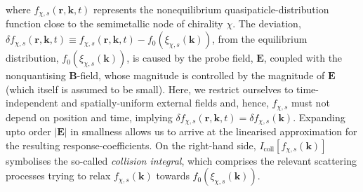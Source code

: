 \documentclass[aps,prb,onecolumn,nofootinbib,citeautoscript,10pt]{revtex4-2}
\begin{document}
where $f_{\chi, s}  (\boldsymbol r, \boldsymbol k, t) $ represents the nonequilibrium quasipaticle-distribution function close to the semimetallic node of chirality $\chi$. The deviation, $ \delta f_{\chi, s} (\boldsymbol r, \boldsymbol k, t) \equiv 
f_{\chi, s}  (\boldsymbol r, \boldsymbol k, t) - f_0 (\xi_{\chi, s} (\boldsymbol k) )$, from the equilibrium distribution, $ f_0 (\xi_{\chi, s}(\boldsymbol k) )$, is caused by the probe field, $\boldsymbol E $, coupled with the nonquantising $\boldsymbol B$-field, whose magnitude is controlled by the magnitude of $\boldsymbol E$ (which itself is assumed to be small). Here, we restrict ourselves to time-independent and spatially-uniform external fields and, hence, $f_{\chi, s} $ must not depend on position and time, implying $ \delta f_{\chi, s}  (\boldsymbol r, \boldsymbol k, t) = \delta f_{\chi, s}  (\boldsymbol k)$. Expanding upto order $|\boldsymbol E|$ in smallness allows us to arrive at the linearised approximation for the resulting response-coefficients. On the right-hand side, $ I_{\text{coll}} [f_{\chi, s} ({\boldsymbol k}) ] $ symbolises the so-called \textit{collision integral}, which comprises the relevant scattering processes trying to relax $f_{\chi, s} ({\boldsymbol k})$ towards $f_0 (\xi_{\chi, s}({\boldsymbol k}))$. 
\end{document}
